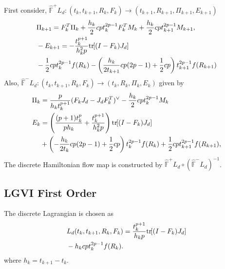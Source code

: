 \documentclass[letterpaper, 10pt, conference]{ieeeconf}
\newcommand{\bracket}[1]{\ensuremath{\left[ #1 \right]}}
\newcommand{\parenth}[1]{\ensuremath{\left( #1 \right)}}
\newcommand{\tr}[1]{\mbox{tr}\ensuremath{\negthickspace\bracket{#1}}}
\begin{document}
First consider, $\hat{\mathbb{F}}^+ L_d: (t_k,t_{k+1},R_k,F_k)\rightarrow(t_{k+1}, R_{k+1}, \Pi_{k+1}, E_{k+1})$
\begin{align*}
&    \Pi_{k+1}  = F_k^T \Pi_k + \frac{h_k}{2} cp t_k^{2p-1} F_k^T M_k +\frac{h_k}{2} cpt^{2p-1}_{k+1} M_{k+1},\\
& -E_{k+1} = -\frac{t^{p+1}_{k}}{h_k^2 p} \tr{(I-F_k)J_d} \\
& - \frac{1}{2}c p t_k^{2p-1} f(R_k)
- \parenth{\frac{h_k}{2t_{k+1}}cp(2p-1)  + \frac{1}{2}c p}       t_{k+1}^{2p-1}  f(R_{k+1})  \\
\end{align*}
Also, $\hat{\mathbb{F}}^- L_d: (t_k,t_{k+1}, R_k, F_k)\rightarrow (t_k, R_k, \Pi_k, E_k)$ given by
\begin{align*}
    \Pi_k & =\frac{p}{h_k t_k^{p+1}} (F_k J_d - J_dF_k^T)^\vee  -\frac{h_k}{2} cp t_k^{2p-1} M_k \\
    E_k & = \parenth{ \frac{(p+1)t_k^p}{p h_k} + \frac{t^{p+1}_{k}}{h_k^2 p} } \tr{(I-F_k)J_d} \\
    & + \parenth{- \frac{h_k}{2 t_k}cp(2p-1) 
        + \frac{1}{2}c p} t_k^{2p-1} f(R_k) + \frac{1}{2}c p t_{k+1}^{2p-1} f(R_{k+1}),\\
\end{align*}
The discrete Hamiltonian flow map is constructed by $\hat{\mathbb{F}}^+L_d \circ (\hat{\mathbb{F}}^-L_d)^{-1}$.

\subsection{LGVI First Order}

The discrete Lagrangian is chosen as
\begin{align*}
    & L_d(t_k, t_{k+1}, R_k, F_k) = \frac{t_{k}^{p+1}}{h_k p} \tr{(I-F_k)J_d}\\
    &- h_k c p t_k^{2p-1} f(R_k).
\end{align*}
where $h_k = t_{k+1}-t_k$.
\end{document}
